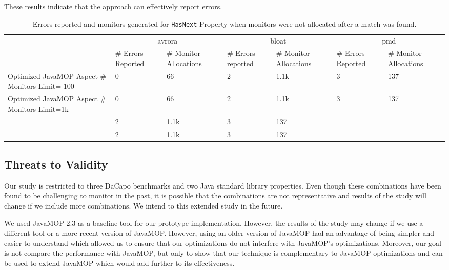 These results indicate that the approach can effectively report errors.


\begin{table*}[ht]
\centering
\begin{tabular}{|p{3.7cm}|p{1.2cm}|p{1.5cm}|p{1.2cm}|p{1.5cm}|p{1.2cm}|p{1.5cm}|
}
\hline
\multirow{2}{*}{}               & \multicolumn{2}{c|}{avrora}             & 
\multicolumn{2}{c|}{bloat}            & \multicolumn{2}{c|}{pmd}              \\ 
\cline{2-7} 
                                       & \# Errors Reported  & \# Monitor 
Allocations & \# Errors reported & \# Monitor Allocations& \# Errors Reported & 
\# Monitor Allocations\\ \hline
Optimized JavaMOP Aspect \# Monitors Limit= 100            & 0             & 66  
          & 2           & 1.1k              & 3               & 137     \\ 
\hline
Optimized JavaMOP Aspect \# Monitors Limit=1k           & 0             & 66     
      & 2            & 1.1k              & 3               & 137       \\ \hline
     & 2            & 1.1k              & 3               &137       \\ \hline
    & 2            & 1.1k              & 3               & 137       \\ \hline
\end{tabular}
\caption{Errors reported and monitors generated for \texttt{HasNext} Property 
when monitors were not allocated after a match was found.}
\end{table*}
\label{table:errorreporting2}


\subsection{Threats to Validity}
\label{subsec:threats}

Our study is restricted to three DaCapo benchmarks and two Java standard library 
properties. Even though these combinations have been found to be challenging to 
monitor in the past, it is possible that the combinations are not representative 
and results of the study will change if we include more combinations. We intend 
to this extended study in the future.

We used JavaMOP 2.3 as a baseline tool for our prototype implementation. 
However, the results of the study may change if we use a different tool or a 
more recent version of JavaMOP. However, using an older version of JavaMOP had 
an advantage of being simpler and easier to understand which allowed us to 
ensure that our optimizations do not interfere with JavaMOP's optimizations. 
Moreover, our goal is not compare the performance with JavaMOP, but only to show 
that our technique is complementary to JavaMOP optimizations and can be used to 
extend JavaMOP which would add further to its effectiveness.


